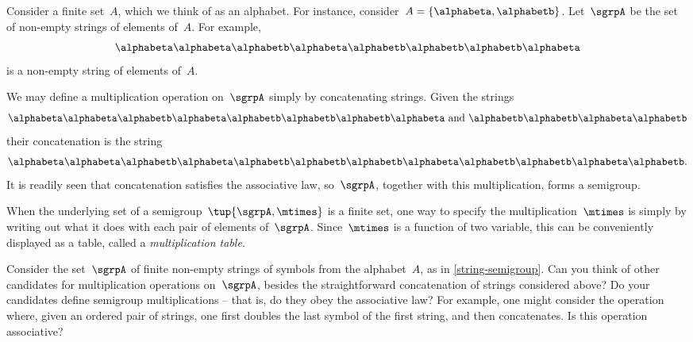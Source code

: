 \begin{example}
\label{string-semigroup}
Consider a finite set~$A$, which we think of as an alphabet. For instance, consider~$A = \{ \alphabeta, \alphabetb \}$.
Let~$\sgrpA$ be the set of non-empty strings of elements of~$A$. For example,
\begin{equation*}
\alphabeta\alphabeta \alphabetb \alphabeta \alphabetb \alphabetb \alphabetb \alphabeta
\end{equation*}
is a non-empty string of elements of~$A$.

We may define a multiplication operation on~$\sgrpA$ simply by concatenating strings. Given the strings
\begin{equation*}
\alphabeta \alphabeta \alphabetb \alphabeta \alphabetb \alphabetb \alphabetb \alphabeta \text{ and } \alphabetb \alphabetb \alphabeta \alphabetb
\end{equation*}
their concatenation is the string
\begin{equation*}
\alphabeta \alphabeta \alphabetb \alphabeta \alphabetb \alphabetb \alphabetb \alphabeta \alphabetb \alphabetb \alphabeta \alphabetb.
\end{equation*}
It is readily seen that concatenation satisfies the associative law, so~$\sgrpA$, together with this multiplication, forms a semigroup.
\end{example}


When the underlying set of a semigroup~$\tup{\sgrpA, \mtimes}$ is a finite set, one way to specify the multiplication~$\mtimes$ is simply by writing out what it does with each pair of elements of~$\sgrpA$.
Since~$\mtimes$ is a function of two variable, this can be conveniently displayed as a table, called a \emph{multiplication table}.


\begin{exercise}
\label{ex:alphabet}
Consider the set~$\sgrpA$ of finite non-empty strings of symbols from the alphabet~$A$, as in \cref{string-semigroup}. Can you think of other candidates for multiplication operations on~$\sgrpA$, besides the straightforward concatenation of strings considered above? Do your candidates define semigroup multiplications -- that is, do they obey the associative law?
For example, one might consider the operation where, given an ordered pair of strings, one first doubles the last symbol of the first string, and then concatenates. Is this operation associative?
\end{exercise}
\begin{solution}
\end{solution}


